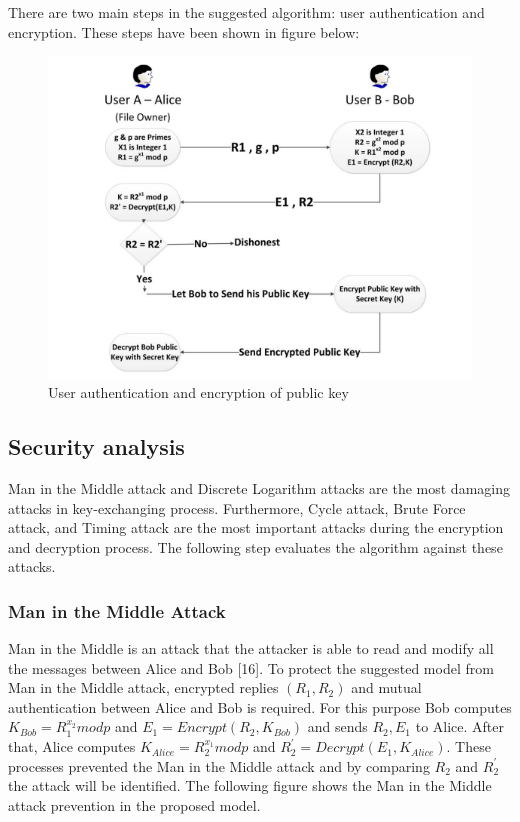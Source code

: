 \pagebreak
There are two main steps in the suggested algorithm: user
authentication and encryption. These steps have been shown in figure below:
\vspace{-10pt}
\begin{figure}[H]
	\centering
	\includegraphics[width=160mm]{images/Userauth.png}{}
	\caption{User authentication and encryption of public key} %
	\label{figauthentication} %
\end{figure}

\subsection{Security analysis}
Man in the Middle attack and Discrete Logarithm attacks
are the most damaging attacks in key-exchanging process.
Furthermore, Cycle attack, Brute Force attack, and Timing
attack are the most important attacks during the encryption
and decryption process. The following step evaluates the
algorithm against these attacks.
\subsubsection{Man in the Middle Attack}
Man in the Middle is an attack that the attacker is able to
read and modify all the messages between Alice and Bob [16].
To protect the suggested model from Man in the Middle
attack, encrypted replies $(R_{1},R_{2})$ and mutual
authentication between Alice  and Bob  is
required. For this purpose Bob computes
$K_{Bob} = R_{1}^{x_{2}} mod p$
and $E_{1}=Encrypt(R_{2},K_{Bob})$ and sends $ R_{2},E_{1}$ to Alice.
After that, Alice computes $K_{Alice} = R_{2}^{x_{1}} mod p$
and $R^{'}_{2}=Decrypt(E_{1},K_{Alice}).$
These processes prevented the Man in the Middle attack and by comparing $R_{2}$ and $R^{'}_{2}$ the attack will be identified. The following figure shows the Man in the Middle attack prevention in the proposed model.

